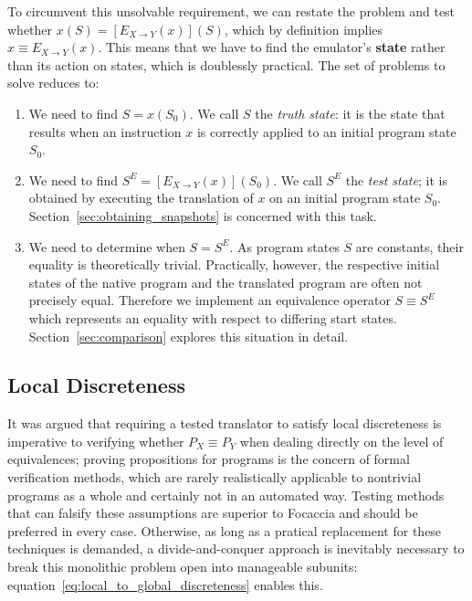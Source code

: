 To circumvent this unsolvable requirement, we can restate the problem and test whether $x(S) = [E_{X \rightarrow
Y}(x)](S)$, which by definition implies $x \equiv E_{X \rightarrow Y}(x)$. This means that we have to find the
emulator's \textbf{state} rather than its action on states, which is doublessly practical. The set of problems to solve
reduces to:

\begin{enumerate}
    \item We need to find $S = x(S_0)$. We call $S$ the \textit{truth state}: it is the state that results when an
        instruction $x$ is correctly applied to an initial program state $S_0$.
    \item We need to find $S^E = [E_{X \rightarrow Y}(x)](S_0)$. We call $S^E$ the \textit{test state}; it is obtained
        by executing the translation of $x$ on an initial program state $S_0$. Section~\ref{sec:obtaining_snapshots} is
        concerned with this task.
    \item We need to determine when $S = S^E$. As program states $S$ are constants, their equality is theoretically
        trivial. Practically, however, the respective initial states of the native program and the translated program
        are often not precisely equal. Therefore we implement an equivalence operator $S \equiv S^E$ which represents an
        equality with respect to differing start states. Section~\ref{sec:comparison} explores this situation in detail.
\end{enumerate}

\subsection{Local Discreteness}\label{sec:local_discreteness}

It was argued that requiring a tested translator to satisfy local discreteness is imperative to verifying whether $P_X
\equiv P_Y$ when dealing directly on the level of equivalences; proving propositions for programs is the concern of
formal verification methods, which are rarely realistically applicable to nontrivial programs as a whole and certainly
not in an automated way. Testing methods that can falsify these assumptions are superior to Focaccia and should be
preferred in every case. Otherwise, as long as a pratical replacement for these techniques is demanded, a
divide-and-conquer approach is inevitably necessary to break this monolithic problem open into manageable subunits:
equation~\ref{eq:local_to_global_discreteness} enables this.

